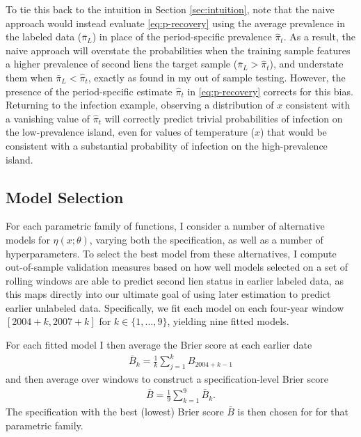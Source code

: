 \documentclass[letterpaper,12pt,usenames,dvipsnames]{article}
\theoremstyle{definition}
\begin{document}
To tie this back to the intuition in Section \ref{sec:intuition}, note that the naive approach would instead evaluate \eqref{eq:p-recovery} using the average prevalence in the labeled data ($\bar{\pi}_{L}$) in place of the period-specific prevalence $\hat{\pi}_t$. As a result, the naive approach will overstate the probabilities when the training sample features a higher prevalence of second liens the target sample ($\bar{\pi}_{L} > \hat{\pi}_t$), and understate them when $\bar{\pi}_{L} < \hat{\pi}_t$, exactly as found in my out of sample testing. However, the presence of the period-specific estimate $\hat{\pi}_t$ in \eqref{eq:p-recovery} corrects for this bias. Returning to the infection example, observing a distribution of $x$ consistent with a vanishing value of $\hat{\pi}_t$ will correctly predict trivial probabilities of infection on the low-prevalence island, even for values of temperature ($x$) that would be consistent with a substantial probability of infection on the high-prevalence island.

\subsection{Model Selection}
\label{sec:model-selection}

For each parametric family of functions, I consider a number of alternative models for $\eta(x; \theta)$, varying both the specification, as well as a number of hyperparameters. To select the best model from these alternatives, I compute out-of-sample validation measures based on how well models selected on a set of rolling windows are able to predict second lien status in earlier labeled data, as this maps directly into our ultimate goal of using later estimation to predict earlier unlabeled data. Specifically, we fit each model on each four-year window $[2004 + k, 2007 + k]$ for $k \in \{1, \ldots, 9\}$, yielding nine fitted models. 

For each fitted model I then average the Brier score at each earlier date
\begin{align*}
	\bar{B}_k = \frac{1}{k} \sum_{j=1}^k B_{2004 + k - 1} 
\end{align*}
and then average over windows to construct a specification-level Brier score
\begin{align*}
	\bar{B} = \frac{1}{9} \sum_{k=1}^9 \bar{B}_k.
\end{align*}
The specification with the best (lowest) Brier score $\bar{B}$ is then chosen for for that parametric family.
\end{document}
